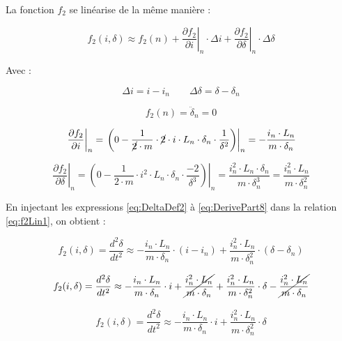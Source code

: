 La fonction $f_2$ se linéarise de la même manière :

\begin{equation}
    f_2(i, \delta) \approx f_2(n)
    + \left. \frac{\partial f_2}{\partial i} \right|_{n}\cdot\Delta{i}
    + \left. \frac{\partial f_2}{\partial \delta} \right|_{n}\cdot\Delta{\delta}
    \label{eq:f2Lin1}
\end{equation}

Avec :

\begin{equation}
    \Delta i = i-i_n \qquad
    \Delta\delta = \delta-\delta_n
    \label{eq:DeltaDef2}
\end{equation}

\begin{equation}
    f_2(n) = \ddot{\delta}_n = 0
    \label{eq:DerivePart6}
\end{equation}

\begin{equation}
    \left. \frac{\partial f_2}{\partial i} \right|_{n} = \left. \left( 0 - \frac{1}{\cancel{2}\cdot m}\cdot \cancel{2}\cdot i\cdot L_n \cdot\delta_n\cdot\frac{1}{\delta^2}\right) \right|_{n} = -\frac{i_n\cdot L_n}{m \cdot\delta_n}
    \label{eq:DerivePart7}
\end{equation}

\begin{equation}
    \left. \frac{\partial f_2}{\partial \delta} \right|_{n} = \left. \left( 0 - \frac{1}{2\cdot m}\cdot i^2\cdot L_n \cdot\delta_n\cdot\frac{-2}{\delta^3}\right) \right|_{n} = \frac{i_n^2\cdot L_n \cdot \delta_n}{m \cdot\delta_n^3}= \frac{i_n^2\cdot L_n}{m \cdot\delta_n^2}
    \label{eq:DerivePart8}
\end{equation}

En injectant les expressions \ref{eq:DeltaDef2} à \ref{eq:DerivePart8} dans la relation \ref{eq:f2Lin1}, on obtient :

$$    f_2(i, \delta) = \frac{d^2\delta}{dt^2} \approx
    -\frac{i_n\cdot L_n}{m \cdot\delta_n}\cdot(i-i_n)
    + \frac{i_n^2\cdot L_n}{m \cdot\delta_n^2}\cdot(\delta-\delta_n)$$

$$    f_2(i, \delta) = \frac{d^2\delta}{dt^2} \approx
    -\frac{i_n\cdot L_n}{m \cdot\delta_n}\cdot i
    +\cancel{\frac{i_n^2\cdot L_n}{m \cdot\delta_n}}
    + \frac{i_n^2\cdot L_n}{m \cdot\delta_n^2}\cdot\delta
    -\cancel{\frac{i_n^2\cdot L_n}{m \cdot\delta_n}}$$

\begin{equation}
    f_2(i, \delta) = \frac{d^2\delta}{dt^2} \approx
    -\frac{i_n\cdot L_n}{m \cdot\delta_n}\cdot i
    + \frac{i_n^2\cdot L_n}{m \cdot\delta_n^2}\cdot\delta
    \label{eq:f2Lin2}
\end{equation}

